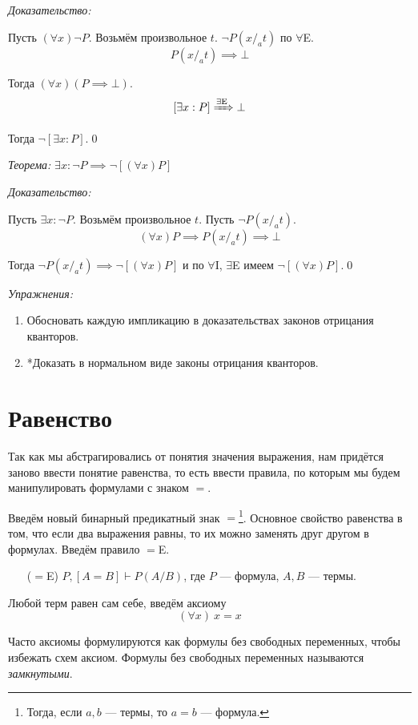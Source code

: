 {\it Доказательство:}

Пусть $(\forall x)\lnot P$. Возьмём произвольное $t$. $\lnot P(x/_{a}t)$ по $\forall$E.
\[
	P(x/_{a}t)\implies \bot
\]

Тогда $(\forall x)(P\implies \bot)$.
\[
	[\exists x:P]\xRightarrow{\text{$\exists$E}} \bot
\]

Тогда $\lnot[\exists x:P]$.\qed

\vspace{1em}
{\it Теорема:} $\exists x:\lnot P\implies\lnot[(\forall x)P]$

{\it Доказательство:}

Пусть $\exists x:\lnot P$. Возьмём произвольное $t$. Пусть $\lnot P(x/_{a}t)$.
\[
	(\forall x)P\implies P(x/_{a}t)\implies \bot
\]

Тогда ${\lnot P(x/_{a}t)\implies \lnot[(\forall x)P]}$ и по $\forall$I, $\exists$E
имеем $\lnot[(\forall x)P]$.\qed

\vspace{1em}
{\it Упражнения:}
\begin{enumerate}
	\item{}Обосновать каждую импликацию в доказательствах законов отрицания кванторов.
	\item{}*Доказать в нормальном виде законы отрицания кванторов.
\end{enumerate}

\section{Равенство}

Так как мы абстрагировались от понятия значения выражения,
нам придётся заново ввести понятие равенства, то есть ввести правила, по которым
мы будем манипулировать формулами с знаком $=$.

Введём новый бинарный предикатный знак $=$\footnote{
	Тогда, если $a,b$	 --- термы, то $a=b$ --- формула.
}.
Основное свойство равенства в том, что если два выражения равны, то их можно
заменять друг другом в формулах. Введём правило $=$E.
\begin{enumerate}
	\item[($=$E)]{}$P,[A=B]\vdash P(A/B)$,
	где $P$ --- формула, $A,B$ --- термы.
\end{enumerate}

Любой терм равен сам себе, введём аксиому
\[
	(\forall x)~x=x
\]

Часто аксиомы формулируются как формулы без
свободных переменных, чтобы избежать схем аксиом.
Формулы без свободных переменных называются {\it замкнутыми}.


